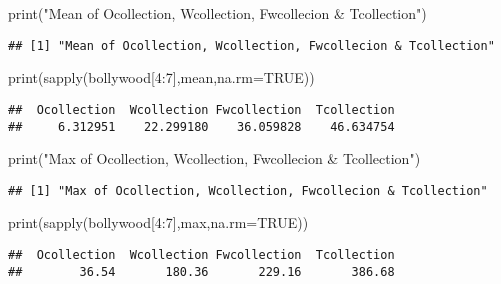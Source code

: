 \documentclass[
]{article}
\newenvironment{Shaded}{\begin{snugshade}}{\end{snugshade}}
\newcommand{\AttributeTok}[1]{\textcolor[rgb]{0.77,0.63,0.00}{#1}}
\newcommand{\ConstantTok}[1]{\textcolor[rgb]{0.00,0.00,0.00}{#1}}
\newcommand{\DecValTok}[1]{\textcolor[rgb]{0.00,0.00,0.81}{#1}}
\newcommand{\FunctionTok}[1]{\textcolor[rgb]{0.00,0.00,0.00}{#1}}
\newcommand{\NormalTok}[1]{#1}
\newcommand{\SpecialCharTok}[1]{\textcolor[rgb]{0.00,0.00,0.00}{#1}}
\newcommand{\StringTok}[1]{\textcolor[rgb]{0.31,0.60,0.02}{#1}}
\begin{document}
\begin{Shaded}
\begin{Highlighting}[]
\FunctionTok{print}\NormalTok{(}\StringTok{"Mean of Ocollection, Wcollection, Fwcollecion \& Tcollection"}\NormalTok{)}
\end{Highlighting}
\end{Shaded}

\begin{verbatim}
## [1] "Mean of Ocollection, Wcollection, Fwcollecion & Tcollection"
\end{verbatim}

\begin{Shaded}
\begin{Highlighting}[]
\FunctionTok{print}\NormalTok{(}\FunctionTok{sapply}\NormalTok{(bollywood[}\DecValTok{4}\SpecialCharTok{:}\DecValTok{7}\NormalTok{],mean,}\AttributeTok{na.rm=}\ConstantTok{TRUE}\NormalTok{))}
\end{Highlighting}
\end{Shaded}

\begin{verbatim}
##  Ocollection  Wcollection Fwcollection  Tcollection 
##     6.312951    22.299180    36.059828    46.634754
\end{verbatim}

\begin{Shaded}
\begin{Highlighting}[]
\FunctionTok{print}\NormalTok{(}\StringTok{"Max of Ocollection, Wcollection, Fwcollecion \& Tcollection"}\NormalTok{)}
\end{Highlighting}
\end{Shaded}

\begin{verbatim}
## [1] "Max of Ocollection, Wcollection, Fwcollecion & Tcollection"
\end{verbatim}

\begin{Shaded}
\begin{Highlighting}[]
\FunctionTok{print}\NormalTok{(}\FunctionTok{sapply}\NormalTok{(bollywood[}\DecValTok{4}\SpecialCharTok{:}\DecValTok{7}\NormalTok{],max,}\AttributeTok{na.rm=}\ConstantTok{TRUE}\NormalTok{))}
\end{Highlighting}
\end{Shaded}

\begin{verbatim}
##  Ocollection  Wcollection Fwcollection  Tcollection 
##        36.54       180.36       229.16       386.68
\end{verbatim}
\end{document}
